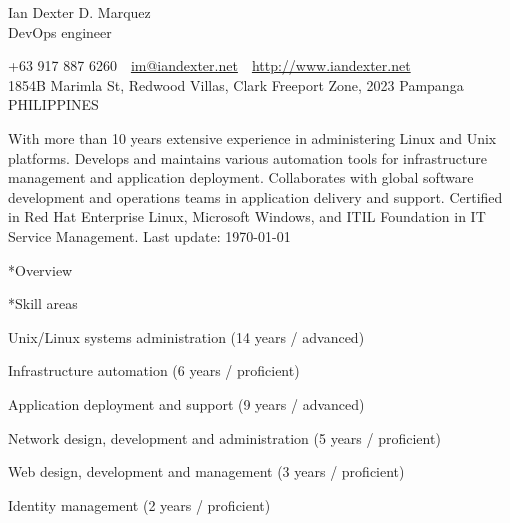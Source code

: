\documentclass[10pt, a4paper, final]{article}
\begin{document}
\begin{center}
  \Huge Ian Dexter D. Marquez\\
  \Large DevOps engineer
\end{center}

\begin{center}\begin{spacing}{1}\small
  +63 917 887 6260~\textbullet~\href{mailto:im@iandexter.net}{im@iandexter.net}~\textbullet~\href{http://www.iandexter.net}{http://www.iandexter.net}\\
  1854B Marimla St, Redwood Villas, Clark Freeport Zone, 2023 Pampanga PHILIPPINES\\
  
\end{spacing}\end{center}
\vspace{1.5em}

\normalsize With more than 10 years extensive experience in administering Linux and Unix platforms. Develops and maintains various automation tools for infrastructure management and application deployment. Collaborates with global software development and operations teams in application delivery and support. Certified in Red Hat Enterprise Linux, Microsoft Windows, and ITIL Foundation in IT Service Management. \small \textcolor{dark-gray}{Last update: \textsc{\today}} \normalsize

\vspace{1em}

\begin{section}*{Overview}
  \begin{subsection}*{Skill areas}
    \begin{compactitem}
      \item Unix/Linux systems administration (14 years / advanced) 
      \item Infrastructure automation (6 years / proficient) 
      \item Application deployment and support (9 years / advanced) 
      \item Network design, development and administration (5 years / proficient) 
      \item Web design, development and management (3 years / proficient) 
      \item Identity management (2 years / proficient) 
    \end{compactitem}
  \end{subsection}
\end{section}
\end{document}
